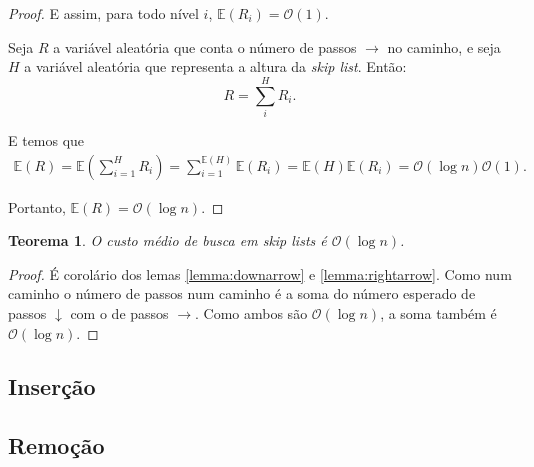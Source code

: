 \documentclass[paper=a4, fontsize=11pt]{scrartcl} %
\newtheorem{theorem}{Teorema}
\numberwithin{equation}{section}
\numberwithin{figure}{section}
\numberwithin{table}{section}
\numberwithin{definition}{section}
\numberwithin{theorem}{section}
\numberwithin{property}{section}
\numberwithin{proposition}{section}
\newcommand{\cO}{\ensuremath{\mathcal{O}}}
\newcommand{\sls}{\textit{skip lists}\xspace}
\newcommand{\skl}{\textit{skip list}\xspace}
\newcommand{\Exp}{\ensuremath{{\mathbb{E}}}\xspace}
\begin{document}
\begin{proof}
E assim, para todo nível $i$, $\Exp(R_i) = \cO(1)$.

Seja $R$ a variável aleatória que conta o número de passos $\rightarrow$ no caminho, 
e seja $H$ a variável aleatória que representa a altura da \skl. Então:
$$
R = \sum_i^H R_i.
$$

E temos que
\begin{align*}
\Exp(R) = \Exp \left( \sum_{i=1}^H R_i \right) = \sum_{i=1}^{\Exp(H)} \Exp(R_i)
 =  \Exp(H) \Exp(R_i) = \cO(\log n) \cO(1).
\end{align*}

Portanto, $\Exp(R) = \cO(\log n).$

\end{proof}

\begin{theorem}
O custo médio de busca em \sls é $\cO(\log n)$. 
\end{theorem}

\begin{proof}
É corolário dos lemas \ref{lemma:downarrow} e \ref{lemma:rightarrow}. Como num caminho o número de passos
num caminho é a soma do número esperado de passos $\downarrow$ com o de passos $\rightarrow$. Como ambos são
$\cO(\log n)$, a soma também é $\cO(\log n)$.
\end{proof}

\subsection{Inserção}




\subsection{Remoção}





{}
\end{document}
